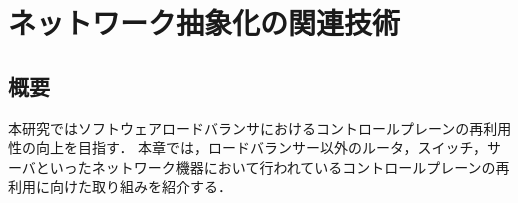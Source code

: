 \chapter{ネットワーク抽象化の関連技術}
\label{related-shadow}

\section{概要}
本研究ではソフトウェアロードバランサにおけるコントロールプレーンの再利用性の向上を目指す．
本章では，ロードバランサー以外のルータ，スイッチ，サーバといったネットワーク機器において行われているコントロールプレーンの再利用に向けた取り組みを紹介する．






